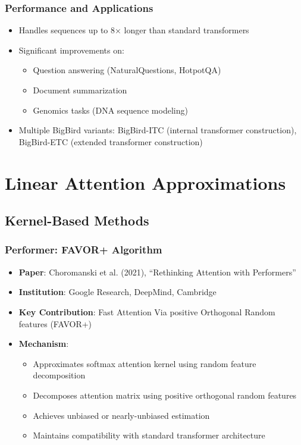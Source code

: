 \documentclass[11pt]{article}
\begin{document}
\subsubsection{Performance and Applications}
\begin{itemize}[leftmargin=*]
    \item Handles sequences up to 8× longer than standard transformers
    \item Significant improvements on:
    \begin{itemize}
        \item Question answering (NaturalQuestions, HotpotQA)
        \item Document summarization
        \item Genomics tasks (DNA sequence modeling)
    \end{itemize}
    \item Multiple BigBird variants: BigBird-ITC (internal transformer construction), BigBird-ETC (extended transformer construction)
\end{itemize}

\section{Linear Attention Approximations}

\subsection{Kernel-Based Methods}

\subsubsection{Performer: FAVOR+ Algorithm}
\begin{itemize}[leftmargin=*]
    \item \textbf{Paper}: Choromanski et al. (2021), ``Rethinking Attention with Performers''~\cite{choromanski2021rethinking}
    \item \textbf{Institution}: Google Research, DeepMind, Cambridge
    \item \textbf{Key Contribution}: Fast Attention Via positive Orthogonal Random features (FAVOR+)
    \item \textbf{Mechanism}:
    \begin{itemize}
        \item Approximates softmax attention kernel using random feature decomposition
        \item Decomposes attention matrix using positive orthogonal random features
        \item Achieves unbiased or nearly-unbiased estimation
        \item Maintains compatibility with standard transformer architecture
    \end{itemize}
\end{itemize}
\end{document}
